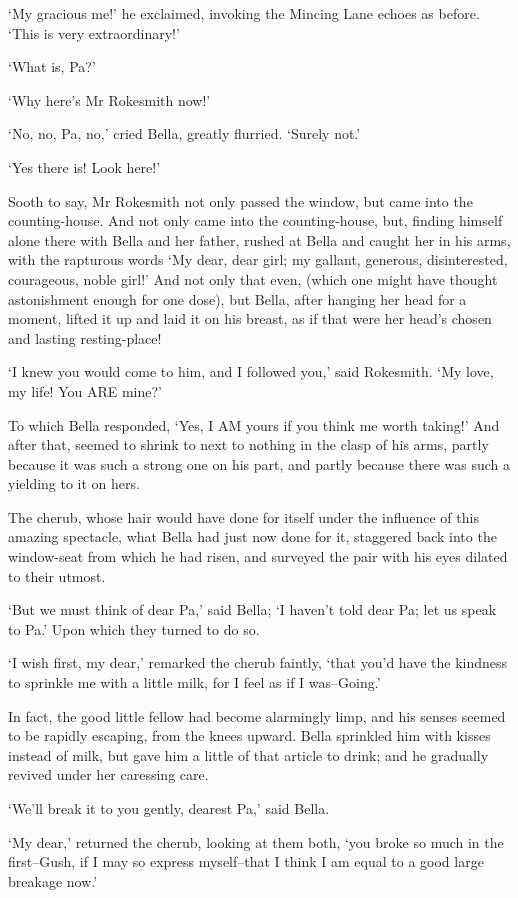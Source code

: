 ‘My gracious me!’ he exclaimed, invoking the Mincing Lane echoes as
before. ‘This is very extraordinary!’

‘What is, Pa?’

‘Why here’s Mr Rokesmith now!’

‘No, no, Pa, no,’ cried Bella, greatly flurried. ‘Surely not.’

‘Yes there is! Look here!’

Sooth to say, Mr Rokesmith not only passed the window, but came into the
counting-house. And not only came into the counting-house, but, finding
himself alone there with Bella and her father, rushed at Bella and
caught her in his arms, with the rapturous words ‘My dear, dear girl; my
gallant, generous, disinterested, courageous, noble girl!’ And not only
that even, (which one might have thought astonishment enough for one
dose), but Bella, after hanging her head for a moment, lifted it up and
laid it on his breast, as if that were her head’s chosen and lasting
resting-place!

‘I knew you would come to him, and I followed you,’ said Rokesmith. ‘My
love, my life! You ARE mine?’

To which Bella responded, ‘Yes, I AM yours if you think me worth
taking!’ And after that, seemed to shrink to next to nothing in the
clasp of his arms, partly because it was such a strong one on his part,
and partly because there was such a yielding to it on hers.

The cherub, whose hair would have done for itself under the influence of
this amazing spectacle, what Bella had just now done for it, staggered
back into the window-seat from which he had risen, and surveyed the pair
with his eyes dilated to their utmost.

‘But we must think of dear Pa,’ said Bella; ‘I haven’t told dear Pa; let
us speak to Pa.’ Upon which they turned to do so.

‘I wish first, my dear,’ remarked the cherub faintly, ‘that you’d have
the kindness to sprinkle me with a little milk, for I feel as if I
was--Going.’

In fact, the good little fellow had become alarmingly limp, and his
senses seemed to be rapidly escaping, from the knees upward. Bella
sprinkled him with kisses instead of milk, but gave him a little of that
article to drink; and he gradually revived under her caressing care.

‘We’ll break it to you gently, dearest Pa,’ said Bella.

‘My dear,’ returned the cherub, looking at them both, ‘you broke so much
in the first--Gush, if I may so express myself--that I think I am equal
to a good large breakage now.’

